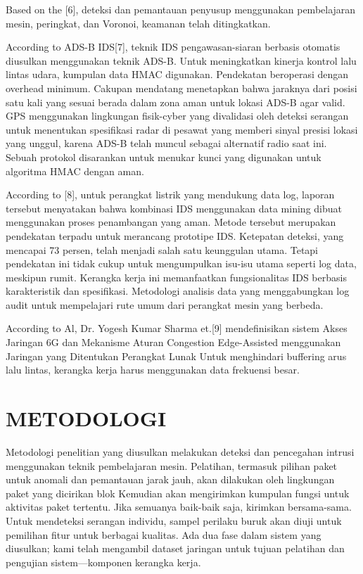 \documentclass[conference]{IEEEtran}
\begin{document}
Based on the [6], deteksi dan pemantauan penyusup menggunakan pembelajaran mesin, peringkat, dan Voronoi, keamanan telah ditingkatkan.

According to ADS-B IDS[7], teknik IDS pengawasan-siaran berbasis otomatis diusulkan menggunakan teknik ADS-B. Untuk meningkatkan kinerja kontrol lalu lintas udara, kumpulan data HMAC digunakan. Pendekatan beroperasi dengan overhead minimum. Cakupan mendatang menetapkan bahwa jaraknya dari posisi satu kali yang sesuai berada dalam zona aman untuk lokasi ADS-B agar valid. GPS menggunakan lingkungan fisik-cyber yang divalidasi oleh deteksi serangan untuk menentukan spesifikasi radar di pesawat yang memberi sinyal presisi lokasi yang unggul, karena ADS-B telah muncul sebagai alternatif radio saat ini. Sebuah protokol disarankan untuk menukar kunci yang digunakan untuk algoritma HMAC dengan aman.

According to [8], untuk perangkat listrik yang mendukung data log, laporan tersebut menyatakan bahwa kombinasi IDS menggunakan data mining dibuat menggunakan proses penambangan yang aman. Metode tersebut merupakan pendekatan terpadu untuk merancang prototipe IDS. Ketepatan deteksi, yang mencapai 73 persen, telah menjadi salah satu keunggulan utama. Tetapi pendekatan ini tidak cukup untuk mengumpulkan isu-isu utama seperti log data, meskipun rumit. Kerangka kerja ini memanfaatkan fungsionalitas IDS berbasis karakteristik dan spesifikasi. Metodologi analisis data yang menggabungkan log audit untuk mempelajari rute umum dari perangkat mesin yang berbeda.

According to Al, Dr. Yogesh Kumar Sharma et.[9] mendefinisikan sistem Akses Jaringan 6G dan Mekanisme Aturan Congestion Edge-Assisted menggunakan Jaringan yang Ditentukan Perangkat Lunak Untuk menghindari buffering arus lalu lintas, kerangka kerja harus menggunakan data frekuensi besar.

\section{METODOLOGI}
Metodologi penelitian yang diusulkan melakukan deteksi dan pencegahan intrusi menggunakan teknik pembelajaran mesin. Pelatihan, termasuk pilihan paket untuk anomali dan pemantauan jarak jauh, akan dilakukan oleh lingkungan paket yang dicirikan blok Kemudian akan mengirimkan kumpulan fungsi untuk aktivitas paket tertentu. Jika semuanya baik-baik saja, kirimkan bersama-sama. Untuk mendeteksi serangan individu, sampel perilaku buruk akan diuji untuk pemilihan fitur untuk berbagai
kualitas. Ada dua fase dalam sistem yang diusulkan; kami telah mengambil dataset jaringan untuk tujuan pelatihan dan pengujian sistem—komponen kerangka kerja.
\end{document}

